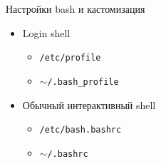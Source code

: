 \begin{frame}{Настройки bash и кастомизация}
  \begin{itemize}
    \item Login shell
      \begin{itemize}
        \item {\tt /etc/profile}
        \item {\tt $\sim$/.bash\_profile }
      \end{itemize}
    \item Обычный интерактивный shell
      \begin{itemize}
        \item {\tt /etc/bash.bashrc}
        \item {\tt $\sim$/.bashrc}
      \end{itemize}
  \end{itemize}
\end{frame}
